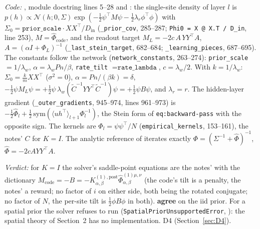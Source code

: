 \documentclass[11pt,a4paper]{article}
\newcommand{\code}[1]{\texttt{#1}}
\newcommand{\agree}{\textbf{agree}}
\begin{document}
\emph{Code:} , module docstring lines 5--28 and : the single-site density of layer $l$ is $p(h)\propto\mathcal N(h; 0, \Sigma)\exp(-\frac12\psi^\top M\psi - \frac12\lambda_r\phi^\top\phi)$ with $\Sigma_0 = \code{prior\_scale}\cdot XX^\top/D_{\mathrm{in}}$ (\code{\_prior\_cov}, 285--287; \code{Phi0 = X @ X.T / D\_in}, line 253), $M = \hat\Phi_{\mathrm{code}}$, and the readout target $M_L = -2c\,A\,YY^\top A$, $A = (\alpha I + \Phi_L)^{-1}$ (\code{\_last\_stein\_target}, 682--684; \code{\_learning\_pieces}, 687--695). The constants follow the network (\code{network\_constants}, 263--274): \code{prior\_scale} $= 1/\lambda_w$, $\alpha = \lambda_wPn/\beta$, \code{rate\_tilt} $= \code{rate\_lambda}$, $c = \lambda_w/2$. With $k = 1/\lambda_w$: $\Sigma_0 = \frac km XX^\top$ ($\sigma^2 = 0$), $\alpha = Pn/(\beta k) = \delta$, $-\frac12\psi M_L\psi = +\frac12\psi\,\lambda_w(\tilde C^{-1}YY^\top\tilde C^{-1})\psi = +\frac12\psi B\psi$, and $\lambda_r = r$. The hidden-layer gradient (\code{\_outer\_gradients}, 945--974, lines 961--973) is $-\frac12\hat\Phi_l + \frac12\,\mathrm{sym}(\langle uh^\top\rangle_{l+1}\Phi_l^{-1})$, the Stein form of \code{eq:backward-pass} with the opposite sign. The kernels are $\Phi_l = \psi\psi^\top/N$ (\code{empirical\_kernels}, 153--161), the notes' $C$ for $K = I$. The analytic reference of  iterates exactly $\Phi = (\Sigma^{-1} + \hat\Phi)^{-1}$, $\hat\Phi = -2cAYY^\top A$.

\emph{Verdict:} for $K = I$ the solver's saddle-point equations are the notes' with the dictionary $M_{\mathrm{code}} = -B = -K^{(1),\mathrm{post}}_{\alpha,\beta}\hat\Phi^{(1)\mu,\nu}_{\alpha,\beta}$ (the code's tilt is a penalty, the notes' a reward; no factor of $i$ on either side, both being the rotated conjugate; no factor of $N$, the per-site tilt is $\frac12\phi B\phi$ in both). \agree{} on the iid prior. For a spatial prior the solver refuses to run (\code{SpatialPriorUnsupportedError}, ): the spatial theory of Section~2 has no implementation. D4 (Section~\ref{sec:D4}).
\end{document}

